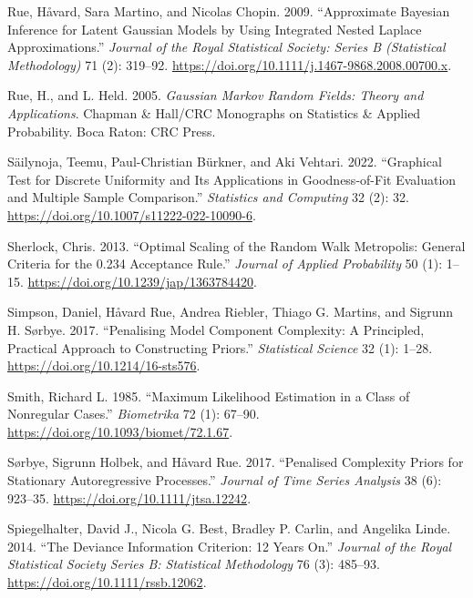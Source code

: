 \documentclass[
  11pt,
  letterpaper,
]{scrbook}
\newlength{\cslhangindent}
\newenvironment{CSLReferences}[2] %
 {\begin{list}{}{%
  \setlength{\itemindent}{0pt}
  \setlength{\leftmargin}{0pt}
  \setlength{\parsep}{0pt}
  \ifodd #1
   \setlength{\leftmargin}{\cslhangindent}
   \setlength{\itemindent}{-1\cslhangindent}
  \fi
  \setlength{\itemsep}{#2\baselineskip}}}
 {\end{list}}
\theoremstyle{plain}
\theoremstyle{definition}
\theoremstyle{definition}
\theoremstyle{plain}
\theoremstyle{plain}
\theoremstyle{definition}
\theoremstyle{remark}
\begin{document}
\begin{CSLReferences}{1}{0}
Rue, Håvard, Sara Martino, and Nicolas Chopin. 2009. {``Approximate
Bayesian Inference for Latent {G}aussian Models by Using Integrated
Nested {L}aplace Approximations.''} \emph{Journal of the Royal
Statistical Society: Series B (Statistical Methodology)} 71 (2):
319--92. \url{https://doi.org/10.1111/j.1467-9868.2008.00700.x}.

Rue, H., and L. Held. 2005. \emph{{G}aussian {M}arkov Random Fields:
Theory and Applications}. Chapman \& Hall/CRC Monographs on Statistics
\& Applied Probability. Boca Raton: CRC Press.

Säilynoja, Teemu, Paul-Christian Bürkner, and Aki Vehtari. 2022.
{``Graphical Test for Discrete Uniformity and Its Applications in
Goodness-of-Fit Evaluation and Multiple Sample Comparison.''}
\emph{Statistics and Computing} 32 (2): 32.
\url{https://doi.org/10.1007/s11222-022-10090-6}.

Sherlock, Chris. 2013. {``Optimal Scaling of the Random Walk
{M}etropolis: General Criteria for the 0.234 Acceptance Rule.''}
\emph{Journal of Applied Probability} 50 (1): 1--15.
\url{https://doi.org/10.1239/jap/1363784420}.

Simpson, Daniel, Håvard Rue, Andrea Riebler, Thiago G. Martins, and
Sigrunn H. Sørbye. 2017. {``Penalising Model Component Complexity: A
Principled, Practical Approach to Constructing Priors.''}
\emph{Statistical Science} 32 (1): 1--28.
\url{https://doi.org/10.1214/16-sts576}.

Smith, Richard L. 1985. {``Maximum Likelihood Estimation in a Class of
Nonregular Cases.''} \emph{Biometrika} 72 (1): 67--90.
\url{https://doi.org/10.1093/biomet/72.1.67}.

Sørbye, Sigrunn Holbek, and Håvard Rue. 2017. {``Penalised Complexity
Priors for Stationary Autoregressive Processes.''} \emph{Journal of Time
Series Analysis} 38 (6): 923--35.
\url{https://doi.org/10.1111/jtsa.12242}.

Spiegelhalter, David J., Nicola G. Best, Bradley P. Carlin, and Angelika
Linde. 2014. {``The Deviance Information Criterion: 12 Years On.''}
\emph{Journal of the Royal Statistical Society Series B: Statistical
Methodology} 76 (3): 485--93. \url{https://doi.org/10.1111/rssb.12062}.


\end{CSLReferences}
\end{document}
